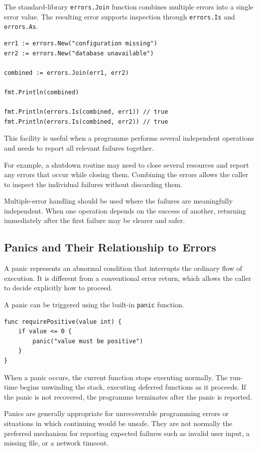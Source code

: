 The standard-library \texttt{errors.Join} function combines multiple errors into a single error value. The resulting error supports inspection through \texttt{errors.Is} and \texttt{errors.As}.

\begin{lstlisting}
err1 := errors.New("configuration missing")
err2 := errors.New("database unavailable")

combined := errors.Join(err1, err2)

fmt.Println(combined)

fmt.Println(errors.Is(combined, err1)) // true
fmt.Println(errors.Is(combined, err2)) // true
\end{lstlisting}

This facility is useful when a programme performs several independent operations and needs to report all relevant failures together.

For example, a shutdown routine may need to close several resources and report any errors that occur while closing them. Combining the errors allows the caller to inspect the individual failures without discarding them.

Multiple-error handling should be used where the failures are meaningfully independent. When one operation depends on the success of another, returning immediately after the first failure may be clearer and safer.

\subsection{Panics and Their Relationship to Errors}

A panic represents an abnormal condition that interrupts the ordinary flow of execution. It is different from a conventional error return, which allows the caller to decide explicitly how to proceed.

A panic can be triggered using the built-in \texttt{panic} function.

\begin{lstlisting}
func requirePositive(value int) {
    if value <= 0 {
        panic("value must be positive")
    }
}
\end{lstlisting}

When a panic occurs, the current function stops executing normally. The run-time begins unwinding the stack, executing deferred functions as it proceeds. If the panic is not recovered, the programme terminates after the panic is reported.

Panics are generally appropriate for unrecoverable programming errors or situations in which continuing would be unsafe. They are not normally the preferred mechanism for reporting expected failures such as invalid user input, a missing file, or a network timeout.

